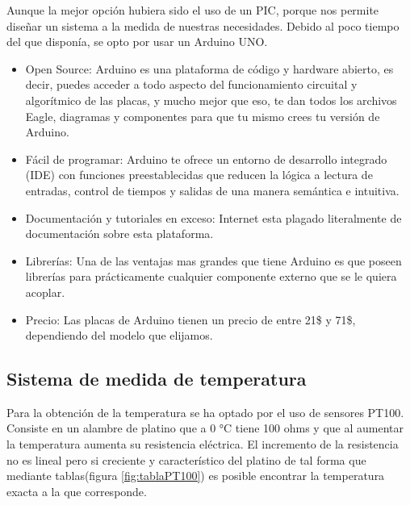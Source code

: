 Aunque la mejor opción hubiera sido el uso de un PIC, porque nos permite diseñar un sistema a la medida de nuestras necesidades. Debido al poco tiempo del que disponía, se opto por usar un Arduino UNO.   
\begin{itemize}
	\item Open Source: Arduino es una plataforma de código y hardware abierto, es decir, puedes acceder a todo aspecto del funcionamiento circuital y algorítmico de las placas, y mucho mejor que eso, te dan todos los archivos Eagle, diagramas y componentes para que tu mismo crees tu versión de Arduino. 
	\item Fácil de programar: Arduino te ofrece un entorno de desarrollo integrado (IDE) con funciones preestablecidas que reducen la lógica a lectura de entradas, control de tiempos y salidas de una manera semántica e intuitiva.
	\item Documentación y tutoriales en exceso: Internet esta plagado literalmente de documentación sobre esta plataforma.
	\item Librerías: Una de las ventajas mas grandes que tiene Arduino es que poseen librerías para prácticamente cualquier componente externo que se le quiera acoplar. 
	\item Precio: Las placas de Arduino tienen un precio de entre 21\$ y 71\$, dependiendo del modelo que elijamos.
\end{itemize}


\subsection{Sistema de medida de temperatura}
Para la obtención de la temperatura se ha optado por el uso de sensores PT100. Consiste en un alambre de
platino que a 0 °C tiene 100 ohms y que al aumentar la temperatura aumenta su resistencia eléctrica. El incremento de la resistencia no es lineal pero si creciente y característico del platino de tal forma que mediante tablas(figura \ref{fig:tablaPT100}) es posible encontrar la temperatura exacta a la que corresponde.

